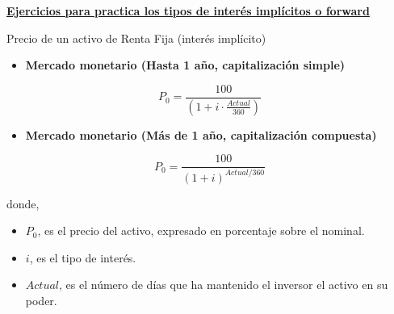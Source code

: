 \documentclass[
  letterpaper,
  DIV=11,
  numbers=noendperiod]{scrreprt}
\providecommand{\tightlist}{%
  \setlength{\itemsep}{0pt}\setlength{\parskip}{0pt}}\usepackage{longtable,booktabs,array}
\begin{document}
\begin{tcolorbox}
\begin{tcolorbox}[enhanced jigsaw, toprule=.15mm, left=2mm, arc=.35mm, breakable, bottomrule=.15mm, opacityback=0, rightrule=.15mm, leftrule=.75mm, colframe=quarto-callout-note-color-frame, colback=white]
\begin{minipage}[t]{\textwidth - 5.5mm}
\href{https://monografia-tipos-spot-forward.netlify.app/}{\textbf{Ejercicios
para practica los tipos de interés implícitos o forward}}

\end{minipage}%
\end{tcolorbox}

\begin{tcolorbox}[enhanced jigsaw, toprule=.15mm, left=2mm, arc=.35mm, breakable, bottomrule=.15mm, opacityback=0, rightrule=.15mm, leftrule=.75mm, colframe=quarto-callout-note-color-frame, colback=white]
\begin{minipage}[t]{5.5mm}
\textcolor{quarto-callout-note-color}{\faInfo}
\end{minipage}%
\begin{minipage}[t]{\textwidth - 5.5mm}

Precio de un activo de Renta Fija (interés implícito)

\begin{itemize}
\tightlist
\item
  \textbf{Mercado monetario (Hasta 1 año, capitalización simple)}
\end{itemize}

\[P_0=\frac{100}{\left(1+i\cdot\frac{Actual}{360}\right)}\]

\begin{itemize}
\tightlist
\item
  \textbf{Mercado monetario (Más de 1 año, capitalización compuesta)}
\end{itemize}

\[P_0=\frac{100}{(1+i)^{Actual/360}}\]

donde,

\begin{itemize}
\item
  \(P_0\), es el precio del activo, expresado en porcentaje sobre el
  nominal.
\item
  \(i\), es el tipo de interés.
\item
  \(Actual\), es el número de días que ha mantenido el inversor el
  activo en su poder.
\end{itemize}

\end{minipage}%
\end{tcolorbox}

\begin{tcolorbox}[enhanced jigsaw, toprule=.15mm, left=2mm, arc=.35mm, breakable, bottomrule=.15mm, opacityback=0, rightrule=.15mm, leftrule=.75mm, colframe=quarto-callout-note-color-frame, colback=white]
\begin{minipage}[t]{5.5mm}
\textcolor{quarto-callout-note-color}{\faInfo}
\end{minipage}%
\begin{minipage}[t]{\textwidth - 5.5mm}


\end{minipage}
\end{tcolorbox}
\end{tcolorbox}
\end{document}
